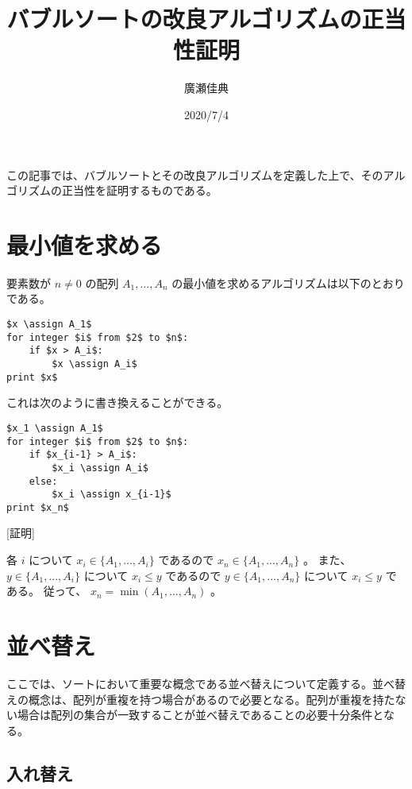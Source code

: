 \documentclass{jsarticle}
\begin{document}
\title{バブルソートの改良アルゴリズムの正当性証明}
\author{廣瀬佳典}
\date{2020/7/4}
\maketitle
この記事では、バブルソートとその改良アルゴリズムを定義した上で、そのアルゴリズムの正当性を証明するものである。

\section{最小値を求める}
要素数が $n \ne 0$ の配列 $A_{1}, ..., A_{n}$ の最小値を求めるアルゴリズムは以下のとおりである。

\lstset{
    frame=single,
    numbers=left,
    tabsize=2
}

\def\assign{~\texttt{:=}~}

\begin{lstlisting}[mathescape]
$x \assign A_1$
for integer $i$ from $2$ to $n$:
    if $x > A_i$:
        $x \assign A_i$
print $x$
\end{lstlisting}

これは次のように書き換えることができる。

\begin{lstlisting}[mathescape]
$x_1 \assign A_1$
for integer $i$ from $2$ to $n$:
    if $x_{i-1} > A_i$:
        $x_i \assign A_i$
    else:
        $x_i \assign x_{i-1}$
print $x_n$
\end{lstlisting}

[証明]

各 $i$ について $x_i \in \{ A_1, ..., A_i \}$ であるので
$x_n \in \{ A_1, ..., A_n \}$ 。
また、 $y \in \{ A_1, ..., A_i \}$ について $x_i \le y$ であるので
$y \in \{ A_1, ..., A_n \}$ について $x_i \le y$ である。
従って、 $x_n = \min ( A_1, ..., A_n )$ 。

\section{並べ替え}

ここでは、ソートにおいて重要な概念である並べ替えについて定義する。並べ替えの概念は、配列が重複を持つ場合があるので必要となる。配列が重複を持たない場合は配列の集合が一致することが並べ替えであることの必要十分条件となる。

\subsection{入れ替え}
\end{document}

